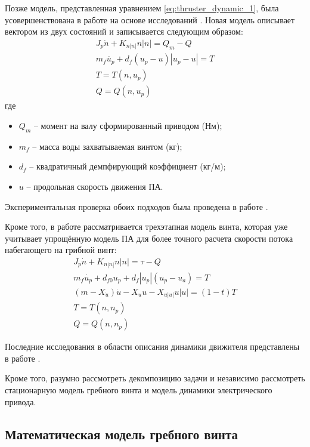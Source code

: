 Позже модель, представленная уравнением \ref{eq:thruster_dynamic_1}, была усовершенствована в работе \cite{10.1109/48.468242} на основе исследований \cite{cody1992experimental, mclean1991dynamic}.
Новая модель описывает вектором из двух состояний и записывается следующим образом:
\begin{gather*}
    J_p\dot{n} + K_{n|n|}n|n| = Q_m- Q \\
    m_f \dot{u_p} + d_f(u_p-u) |u_p - u| = T \\
    T = T(n,u_p) \\
    Q = Q(n,u_p)
\end{gather*}
\noindent где
\begin{itemize}
    \item $Q_m$ -- момент на валу сформированный приводом (Нм);
    \item $m_f$ -- масса воды захватываемая винтом (кг);
    \item $d_f$ -- квадратичный демпфирующий коэффициент (кг/м);
    \item $u$ -- продольная скорость движения ПА.
\end{itemize}

Экспериментальная проверка обоих подходов была проведена в работе \cite{whitcomb1999development}.

Кроме того, в работе \cite{blanke2000dynamic} рассматривается трехэтапная модель винта, которая уже учитывает упрощённую модель ПА для более точного расчета скорости потока набегающего на грибной винт:
\begin{gather*}
    J_p\dot{n} + K_{n|n|}n|n| = \tau - Q \\
    m_f \dot{u_p} + d_{f0}u_p + d_f|u_p|(u_p - u_a) = T \\
    (m - X_{\dot{u}})\dot{u} - X_u u - X_{u|u|}u|u| = (1-t)T\\
    T = T(n,n_p) \\
    Q = Q(n,n_p)
\end{gather*}

Последние исследования в области описания динамики движителя представлены в работе \cite{10.1109/robot.2005.1570115}.

Кроме того, разумно рассмотреть декомпозицию задачи и независимо рассмотреть стационарную модель гребного винта и модель динамики электрического привода.

\subsection{Математическая модель гребного винта}

